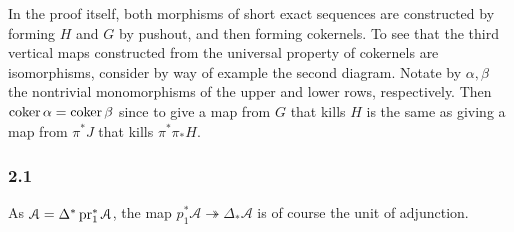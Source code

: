 \documentclass[deligne.tex]{subfiles}
\begin{document}
In the proof itself, both morphisms of short exact sequences are constructed 
by forming $H$ and $G$ by pushout, and then forming cokernels. To see that
the third vertical maps constructed from the universal property of cokernels
are isomorphisms, consider by way of example the second diagram.
Notate by $\alpha,\beta$ the nontrivial monomorphisms of the
upper and lower rows, respectively. Then $\operatorname{coker}\alpha=\operatorname{coker}\beta$ since to
give a map from $G$ that kills $H$ is the same as giving a map from
$\pi^*J$ that kills $\pi^*\pi_*H$.

\subsubsection*{2.1}
As $\mathcal A=\Delta^*\operatorname{pr}_1^*\mathcal A$, the map 
$p_1^*\mathcal A\twoheadrightarrow\Delta_*\mathcal A$ is of
course the unit of adjunction.
\end{document}
